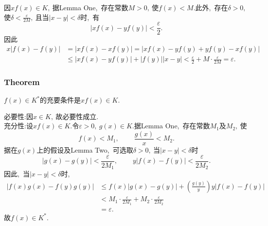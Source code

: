 	\begin{solution}
		因$xf(x)\in K,\ $据Lemma One,\ 存在常数$M>0,\ $使$f(x)<M.$此外,\ 存在$\delta>0,\ $使$\delta < \frac{\varepsilon}{2M},\ $且当$|x-y|<\delta$时,\ 有
		$$|xf(x)-yf(y)|<\frac{\varepsilon}{2}.$$
		因此
		\begin{align*}
			x|f(x)-f(y)|&=|xf(x)-xf(y)|=|xf(x)-yf(y)+yf(y)-xf(y)|\\
			&\le|xf(x)-yf(y)|+|f(y)||x-y|<\frac{\varepsilon}{2}+M\cdot\frac{\varepsilon}{2M}=\varepsilon.
		\end{align*} 
	\end{solution}
	
	\subsubsection{Theorem}
	\begin{problem}
		$f(x)\in K^*$的充要条件是$xf(x)\in K.$
	\end{problem}
	
	\begin{solution}
		必要性:因$x\in K,\ $故必要性成立.\\
		充分性:设$xf(x)\in K.$令$\varepsilon>0,\ g(x)\in K.$据Lemma One,\ 存在常数$M_1$及$M_2,\ $使
		$$f(x)<M_1,\ \qquad\frac{g(x)}{x}<M_2.$$
		据在$g(x)$上的假设及Lemma Two,\ 可选取$\delta > 0,\ $当$|x-y|<\delta$时
		$$|g(x)-g(y)|<\frac{\varepsilon}{2M_1},\ \qquad y|f(x)-f(y)|<\frac{\varepsilon}{2M_2}.$$
		因此,\ 当$|x-y|<\delta$时,\ 
		\begin{align*}
			|f(x)g(x)-f(y)g(y)|&\le f(x)|g(x)-g(y)|+\left(\frac{g(y)}{y}\right)y|f(x)-f(y)|\\
			&<M_1\cdot \frac{\varepsilon}{2M_1}+ M_2\cdot \frac{\varepsilon}{2M_2}\\
			&=\varepsilon.
		\end{align*}
		故$f(x)\in K^*.$ 
	\end{solution}